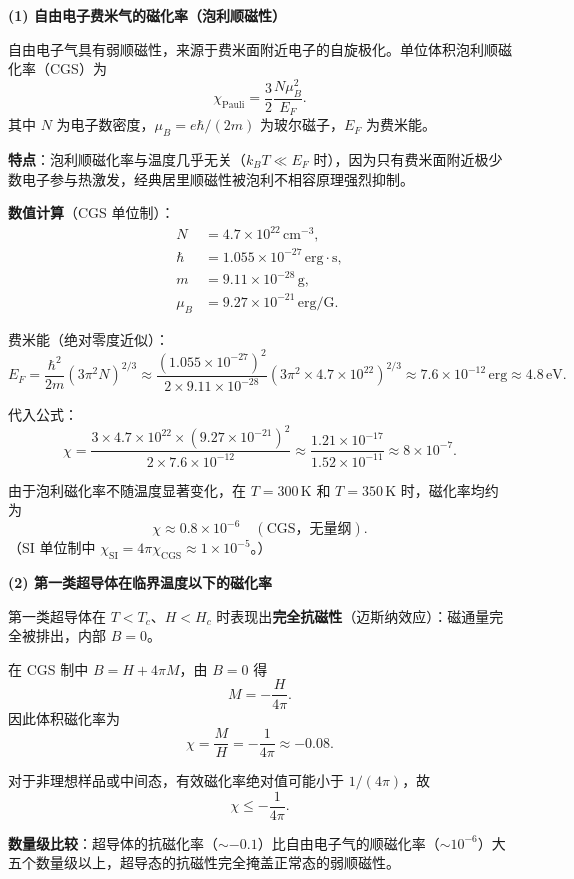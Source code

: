 \begin{derivationbox}[标准解题过程]
\textbf{(1) 自由电子费米气的磁化率（泡利顺磁性）}

自由电子气具有弱顺磁性，来源于费米面附近电子的自旋极化。单位体积泡利顺磁化率（CGS）为
\begin{equation}
\chi_{\text{Pauli}}=\frac{3}{2}\frac{N\mu_B^2}{E_F}.
\end{equation}
其中 $N$ 为电子数密度，$\mu_B=e\hbar/(2m)$ 为玻尔磁子，$E_F$ 为费米能。

\textbf{特点}：泡利顺磁化率与温度几乎无关（$k_BT\ll E_F$ 时），因为只有费米面附近极少数电子参与热激发，经典居里顺磁性被泡利不相容原理强烈抑制。

\textbf{数值计算}（CGS 单位制）：
\begin{align}
N&=4.7\times10^{22}\,\text{cm}^{-3},\\
\hbar&=1.055\times10^{-27}\,\text{erg}\cdot\text{s},\\
m&=9.11\times10^{-28}\,\text{g},\\
\mu_B&=9.27\times10^{-21}\,\text{erg/G}.
\end{align}

费米能（绝对零度近似）：
\begin{equation}
E_F=\frac{\hbar^2}{2m}(3\pi^2N)^{2/3}
\approx\frac{(1.055\times10^{-27})^2}{2\times9.11\times10^{-28}}(3\pi^2\times4.7\times10^{22})^{2/3}
\approx 7.6\times10^{-12}\,\text{erg}\approx4.8\,\text{eV}.
\end{equation}

代入公式：
\begin{equation}
\chi=\frac{3\times4.7\times10^{22}\times(9.27\times10^{-21})^2}{2\times7.6\times10^{-12}}
\approx\frac{1.21\times10^{-17}}{1.52\times10^{-11}}
\approx 8\times10^{-7}.
\end{equation}

由于泡利磁化率不随温度显著变化，在 $T=300\,\text{K}$ 和 $T=350\,\text{K}$ 时，磁化率均约为
\begin{equation}
\boxed{\chi\approx0.8\times10^{-6}\quad(\text{CGS，无量纲}).}
\end{equation}
（SI 单位制中 $\chi_{\text{SI}}=4\pi\chi_{\text{CGS}}\approx1\times10^{-5}$。）

\textbf{(2) 第一类超导体在临界温度以下的磁化率}

第一类超导体在 $T<T_c$、$H<H_c$ 时表现出\textbf{完全抗磁性}（迈斯纳效应）：磁通量完全被排出，内部 $B=0$。

在 CGS 制中 $B=H+4\pi M$，由 $B=0$ 得
\begin{equation}
M=-\frac{H}{4\pi}.
\end{equation}
因此体积磁化率为
\begin{equation}
\boxed{\chi=\frac{M}{H}=-\frac{1}{4\pi}\approx-0.08.}
\end{equation}

对于非理想样品或中间态，有效磁化率绝对值可能小于 $1/(4\pi)$，故
\begin{equation}
\chi\le-\frac{1}{4\pi}.
\end{equation}

\textbf{数量级比较}：超导体的抗磁化率（$\sim-0.1$）比自由电子气的顺磁化率（$\sim10^{-6}$）大五个数量级以上，超导态的抗磁性完全掩盖正常态的弱顺磁性。
\end{derivationbox}
